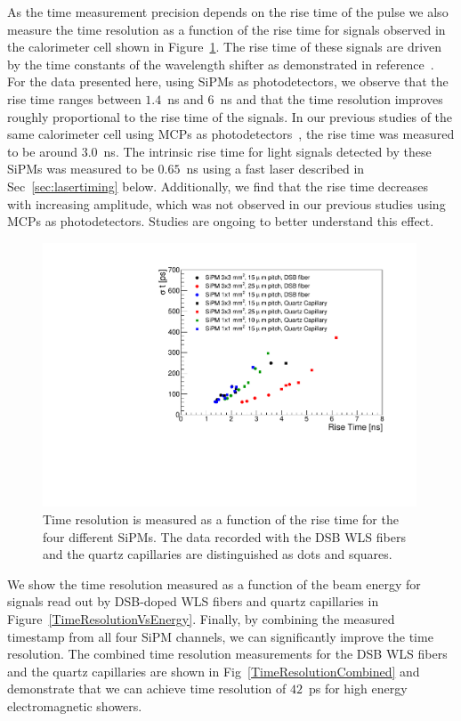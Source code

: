 As the time measurement precision depends on the rise time of the pulse we also
measure the time resolution as a function of the rise time for signals observed
in the calorimeter cell shown in Figure~\ref{RiseTime}. The rise time of these
signals are driven by the time constants of the wavelength shifter as
demonstrated in reference~\cite{Anderson:2015gha}. For the data presented here,
using SiPMs as photodetectors, we observe that the rise time ranges between
$1.4$~ns and $6$~ns and that the time resolution improves roughly proportional
to the rise time of the signals. In our previous studies of the same calorimeter 
cell using MCPs as photodetectors~\cite{Anderson:2015gha}, the rise time was measured to be around 
$3.0$~ns. The intrinsic rise time for light signals detected by these SiPMs was
measured to be $0.65$~ns using a fast laser described in Sec~\ref{sec:lasertiming} below. 
Additionally, we find that the rise time decreases with increasing amplitude, which was
not observed in our previous studies using MCPs as photodetectors. 
Studies are ongoing to better understand this effect.

\begin{figure}[!htb]
\centering
\includegraphics[width=0.99\textwidth]{figures/ShashlikTimeResolutionVsRiseTime.pdf}
\caption{\label{RiseTime}Time resolution is measured as a function of the rise time
for the four different SiPMs. The data recorded with the DSB WLS fibers and the
quartz capillaries are distinguished as dots and squares. }
\end{figure}

We show the time resolution measured as a function of the beam energy for
signals read out by DSB-doped WLS fibers and quartz capillaries in 
Figure~\ref{TimeResolutionVsEnergy}. Finally, by combining the measured timestamp
from all four SiPM channels, we can significantly improve the time resolution.
The combined time resolution measurements for the DSB WLS fibers and the quartz capillaries 
are shown in Fig~\ref{TimeResolutionCombined} and demonstrate that we can achieve time resolution
of $42$~ps for high energy electromagnetic showers.



